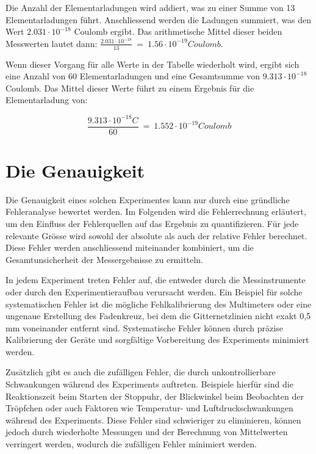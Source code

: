 \par
\noindent Die Anzahl der Elementarladungen wird addiert, was zu einer Summe von 13 Elementarladungen führt. Anschliessend werden die Ladungen summiert, was den Wert $2.031 \cdot 10^{-18}$ Coulomb ergibt. Das arithmetische Mittel dieser beiden Messwerten lautet dann: $\frac{2.031 \cdot 10^{-18}}{13} \ = \ 1.56 \cdot 10^{-19} Coulomb$. 

Wenn dieser Vorgang für alle Werte in der Tabelle wiederholt wird, ergibt sich eine Anzahl von 60 Elementarladungen und eine Gesamtsumme von $9.313 \cdot 10^{-18}$ Coulomb. Das Mittel dieser Werte führt zu einem Ergebnis für die Elementarladung von:

\begin{equation}\label{eq:ergebnis}
	\frac{9.313 \cdot 10^{-18}C}{60} \ = \ 1.552 \cdot 10^{-19} Coulomb
\end{equation}

\section{Die Genauigkeit}\label{sec:genauigkeitAuswertung}
Die Genauigkeit eines solchen Experimentes kann nur durch eine gründliche Fehleranalyse bewertet werden. Im Folgenden wird die Fehlerrechnung erläutert, um den Einfluss der Fehlerquellen auf das Ergebnis zu quantifizieren. Für jede relevante Grösse wird sowohl der absolute als auch der relative Fehler berechnet. Diese Fehler werden anschliessend miteinander kombiniert, um die Gesamtunsicherheit der Messergebnisse zu ermitteln.

In jedem Experiment treten Fehler auf, die entweder durch die Messinstrumente oder durch den Experimentieraufbau verursacht werden. Ein Beispiel für solche systematischen Fehler ist die mögliche Fehlkalibrierung des Multimeters oder eine ungenaue Erstellung des Fadenkreuz, bei dem die Gitternetzlinien nicht exakt 0,5 mm voneinander entfernt sind. Systematische Fehler können durch präzise Kalibrierung der Geräte und sorgfältige Vorbereitung des Experiments minimiert werden.

Zusätzlich gibt es auch die zufälligen Fehler, die durch unkontrollierbare Schwankungen während des Experiments auftreten. Beispiele hierfür sind die Reaktionszeit beim Starten der Stoppuhr, der Blickwinkel beim Beobachten der Tröpfchen oder auch Faktoren wie Temperatur- und Luftdruckschwankungen während des Experiments. Diese Fehler sind schwieriger zu eliminieren, können jedoch durch wiederholte Messungen und der Berechnung von Mittelwerten verringert werden, wodurch die zufälligen Fehler minimiert werden.

